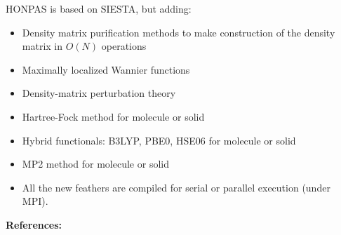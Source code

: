 \documentclass[11pt]{article}
\begin{document}
{\sc HONPAS} is based on {\sc SIESTA}, but adding:

\begin{itemize}
\item Density matrix purification methods to make construction of the density matrix in $O(N)$ operations

\item Maximally localized Wannier functions

\item Density-matrix perturbation theory

\item Hartree-Fock method for molecule or solid 

\item Hybrid functionals: B3LYP, PBE0, HSE06  for molecule or solid 

\item MP2 method for molecule or solid 

\item All the new feathers are compiled for serial or parallel execution (under MPI).

\end{itemize}


\vspace{0.5cm}
{\large {\bf References:} }
\end{document}

